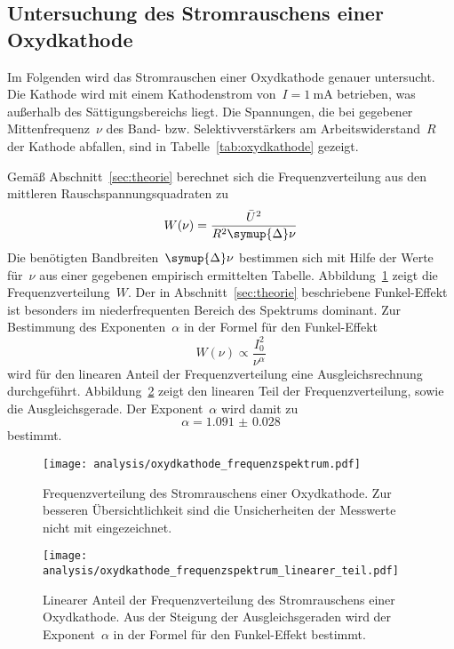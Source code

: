\subsection{Untersuchung des Stromrauschens einer Oxydkathode}

Im Folgenden wird das Stromrauschen einer Oxydkathode genauer untersucht. Die
Kathode wird mit einem Kathodenstrom von~$I=\SI{1}{\milli\ampere}$ betrieben,
was außerhalb des Sättigungsbereichs liegt. Die Spannungen, die bei gegebener
Mittenfrequenz~$\nu$ des Band- bzw. Selektivverstärkers am Arbeitswiderstand~$R$
der Kathode abfallen, sind in Tabelle~\ref{tab:oxydkathode} gezeigt.

Gemäß Abschnitt~\ref{sec:theorie} berechnet sich die Frequenzverteilung aus den
mittleren Rauschspannungsquadraten zu
%
\begin{equation}
  W(\nu)=\frac{\bar{U}^2}{R^2\symup{\Delta}\nu}
\end{equation}
%
Die benötigten Bandbreiten~$\symup{\Delta}\nu$ bestimmen sich mit Hilfe der
Werte für~$\nu$ aus einer gegebenen empirisch ermittelten Tabelle.
Abbildung~\ref{fig:oxydkathode_frequenzspektrum} zeigt die
Frequenzverteilung~$W$. Der in Abschnitt~\ref{sec:theorie} beschriebene
Funkel-Effekt ist besonders im niederfrequenten Bereich des Spektrums dominant.
Zur Bestimmung des Exponenten~$\alpha$ in der Formel für den Funkel-Effekt
%
\begin{equation}
  W(\nu)\propto\frac{I_0^2}{\nu^{\alpha}}
\end{equation}
%
wird für den linearen Anteil der Frequenzverteilung eine Ausgleichsrechnung
durchgeführt. Abbildung~\ref{fig:oxydkathode_frequenzspektrum_linearer_teil}
zeigt den linearen Teil der Frequenzverteilung, sowie die Ausgleichsgerade. Der
Exponent~$\alpha$ wird damit zu
%
\begin{equation}
  \alpha=\num{1.091(28)}
\end{equation}
%
bestimmt.

\begin{figure}[htb]
  \centering
  \texttt{[image: analysis/oxydkathode\_frequenzspektrum.pdf]}
  \caption{Frequenzverteilung des Stromrauschens einer Oxydkathode. Zur besseren
  Übersichtlichkeit sind die Unsicherheiten der Messwerte nicht mit
  eingezeichnet.}
  \label{fig:oxydkathode_frequenzspektrum}
\end{figure}

\begin{figure}[htb]
  \centering
  \texttt{[image: analysis/oxydkathode\_frequenzspektrum\_linearer\_teil.pdf]}
  \caption{Linearer Anteil der Frequenzverteilung des Stromrauschens einer
  Oxydkathode. Aus der Steigung der Ausgleichsgeraden wird der Exponent~$\alpha$
  in der Formel für den Funkel-Effekt bestimmt.}
  \label{fig:oxydkathode_frequenzspektrum_linearer_teil}
\end{figure}


